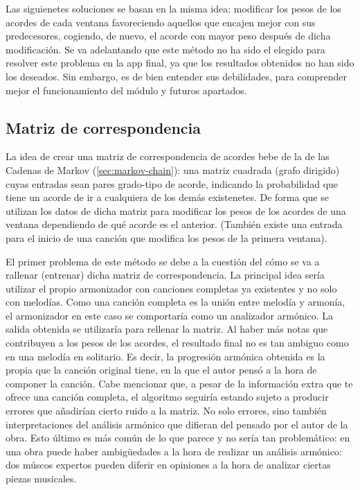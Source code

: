 Las siguienetes soluciones se basan en la misma idea: modificar los pesos de los acordes de cada ventana favoreciendo aquellos que encajen mejor con sus predecesores, cogiendo, de nuevo, el acorde con mayor peso después de dicha modificación. Se va adelantando que este método no ha sido el elegido para resolver este problema en la app final, ya que los resultados obtenidos no han sido los deseados. Sin embargo, es de bien entender sus debilidades, para comprender mejor el funcionamiento del módulo y futuros apartados.

\subsection{Matriz de correspondencia}

La idea de crear una matriz de correspondencia de acordes bebe de la de las Cadenas de Markov (\ref{sec:markov-chain}): una matriz cuadrada (grafo dirigido) cuyas entradas sean pares grado-tipo de acorde, indicando la probabilidad que tiene un acorde de ir a cualquiera de los demás existenetes. De forma que se utilizan los datos de dicha matriz para modificar los pesos de los acordes de una ventana dependiendo de qué acorde es el anterior. (También existe una entrada para el inicio de una canción que modifica los pesos de la primera ventana).

El primer problema de este método se debe a la cuestión del cómo se va a rallenar (entrenar) dicha matriz de correspondencia. La principal idea sería utilizar el propio armonizador con canciones completas ya existentes y no solo con melodías. Como una canción completa es la unión entre melodía y armonía, el armonizador en este caso se comportaría como un analizador armónico. La salida obtenida se utilizaría para rellenar la matriz. Al haber más notas que contribuyen a los pesos de los acordes, el resultado final no es tan ambiguo como en una melodía en solitario. Es decir, la progresión armónica obtenida es la propia que la canción original tiene, en la que el autor pensó a la hora de componer la canción. Cabe mencionar que, a pesar de la información extra que te ofrece una canción completa, el algoritmo seguiría estando sujeto a producir errores que añadirían cierto ruido a la matriz. No solo errores, sino también interpretaciones del análisis armónico que difieran del pensado por el autor de la obra. Esto último es más común de lo que parece y no sería tan problemático: en una obra puede haber ambigüedades a la hora de realizar un análisis armónico: dos múscos expertos pueden diferir en opiniones a la hora de analizar ciertas piezas musicales.

